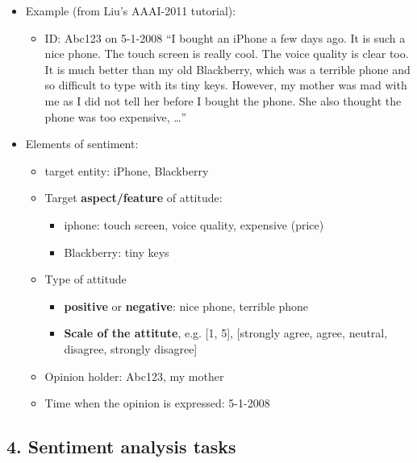 \documentclass[11pt]{article}
\providecommand{\tightlist}{%
      \setlength{\itemsep}{0pt}\setlength{\parskip}{0pt}}
\begin{document}
\begin{itemize}
\tightlist
\item
  Example (from Liu's AAAI-2011 tutorial):

  \begin{itemize}
  \tightlist
  \item
    ID: Abc123 on 5-1-2008 ``I bought an iPhone a few days ago. It is
    such a nice phone. The touch screen is really cool. The voice
    quality is clear too. It is much better than my old Blackberry,
    which was a terrible phone and so difficult to type with its tiny
    keys. However, my mother was mad with me as I did not tell her
    before I bought the phone. She also thought the phone was too
    expensive, \ldots{}''\\
  \end{itemize}
\item
  Elements of sentiment:

  \begin{itemize}
  \tightlist
  \item
    target entity: iPhone, Blackberry
  \item
    Target \textbf{aspect/feature} of attitude:

    \begin{itemize}
    \tightlist
    \item
      iphone: touch screen, voice quality, expensive (price) 
    \item
      Blackberry: tiny keys
    \end{itemize}
  \item
    Type of attitude

    \begin{itemize}
    \tightlist
    \item
      \textbf{positive} or \textbf{negative}: nice phone, terrible phone
    \item
      \textbf{Scale of the attitute}, e.g. {[}1, 5{]}, {[}strongly
      agree, agree, neutral, disagree, strongly disagree{]}
    \end{itemize}
  \item
    Opinion holder: Abc123, my mother
  \item
    Time when the opinion is expressed: 5-1-2008
  \end{itemize}
\end{itemize}

    \hypertarget{sentiment-analysis-tasks}{%
\subsection{4. Sentiment analysis
tasks}\label{sentiment-analysis-tasks}}
\end{document}
